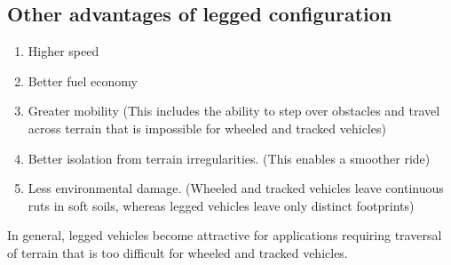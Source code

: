 \documentclass{report}
\begin{document}
\subsection*{Other advantages of legged configuration}
\begin{enumerate}
\item Higher speed
\item Better fuel economy
\item Greater mobility (This includes the ability to step over obstacles and travel across terrain that is impossible for wheeled and tracked vehicles)
\item Better isolation from terrain irregularities. (This enables a smoother ride)
\item Less environmental damage. (Wheeled and tracked vehicles leave continuous ruts in soft soils, whereas legged vehicles leave only distinct footprints)
\end{enumerate}
In general, legged vehicles become attractive for applications requiring traversal of terrain that is too difficult for wheeled and tracked vehicles.   
\end{document}
